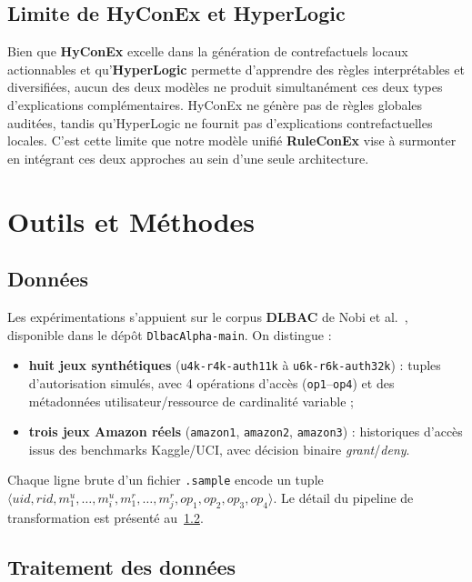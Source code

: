 \documentclass[12pt,a4paper]{article}
\begin{document}
\subsection{Limite de HyConEx et HyperLogic}
Bien que \textbf{HyConEx} excelle dans la génération de contrefactuels locaux actionnables et qu'\textbf{HyperLogic} permette d'apprendre des règles interprétables et diversifiées, aucun des deux modèles ne produit simultanément ces deux types d'explications complémentaires. HyConEx ne génère pas de règles globales auditées, tandis qu'HyperLogic ne fournit pas d'explications contrefactuelles locales. C'est cette limite que notre modèle unifié \textbf{RuleConEx} vise à surmonter en intégrant ces deux approches au sein d'une seule architecture.

\section{Outils et M\'ethodes}

\subsection{Donn\'ees}

Les exp\'erimentations s'appuient sur le corpus \textbf{DLBAC} de Nobi et al.~\cite{nobi2022}, disponible dans le d\'ep\^ot \texttt{DlbacAlpha-main}. On distingue :
\begin{itemize}
  \item \textbf{huit jeux synth\'etiques} (\texttt{u4k-r4k-auth11k} \`a \texttt{u6k-r6k-auth32k}) : tuples d'autorisation simul\'es, avec 4 op\'erations d'acc\`es (\texttt{op1}--\texttt{op4}) et des m\'etadonn\'ees utilisateur/ressource de cardinalit\'e variable ;
  \item \textbf{trois jeux Amazon r\'eels} (\texttt{amazon1}, \texttt{amazon2}, \texttt{amazon3}) : historiques d'acc\`es issus des benchmarks Kaggle/UCI, avec d\'ecision binaire \textit{grant}/\textit{deny}.
\end{itemize}
Chaque ligne brute d'un fichier \texttt{.sample} encode un tuple
$\langle uid, rid, m^u_1,\ldots,m^u_i, m^r_1,\ldots,m^r_j, op_1,op_2,op_3,op_4\rangle$.
Le d\'etail du pipeline de transformation est pr\'esent\'e au~\ref{subsec:traitement-donnees}.

\subsection{Traitement des donn\'ees}
\label{subsec:traitement-donnees}
\end{document}
